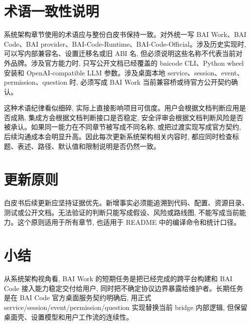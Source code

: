 \section{术语一致性说明}
系统架构章节使用的术语应与整份白皮书保持一致。对外统一写 BAI Work、BAI Code、BAI provider、BAI-Code-Runtime、BAI-Code-Official。涉及历史实现时, 可以写内部兼容名、设置迁移名或旧 ABI 名, 但必须说明这些名称不代表当前对外品牌。涉及官方能力时, 只写公开文档已经覆盖的 baicode CLI、Python wheel 安装和 OpenAI-compatible LLM 参数。涉及桌面本地 service、session、event、permission、question 时, 必须写成 BAI Work 当前兼容桥或待官方公开契约确认。

这种术语纪律看似细碎, 实际上直接影响项目可信度。用户会根据文档判断应用是否成熟, 集成方会根据文档判断接口是否稳定, 安全评审会根据文档判断风险是否被承认。如果同一能力在不同章节被写成不同名称, 或把过渡实现写成官方契约, 后续沟通成本会明显升高。因此每次更新系统架构相关内容时, 都应同时检查标题、表述、路径、默认值和限制说明是否仍然一致。

\section{更新原则}
白皮书后续更新应坚持证据优先。新增事实必须能追溯到代码、配置、资源目录、测试或公开文档。无法验证的判断只能写成假设、风险或路线图, 不能写成当前能力。这个原则适用于所有章节, 也适用于 README 中的编译命令和统计口径。

\section{小结}
从系统架构视角看, BAI Work 的短期任务是把已经完成的跨平台构建和 BAI Code 接入能力稳定交付给用户, 同时把不确定协议边界暴露给维护者。长期任务是在 BAI Code 官方桌面服务契约明确后, 用正式 service/session/event/permission/question 实现替换当前 bridge 内部逻辑, 但保留桌面壳、设置模型和用户工作流的连续性。
